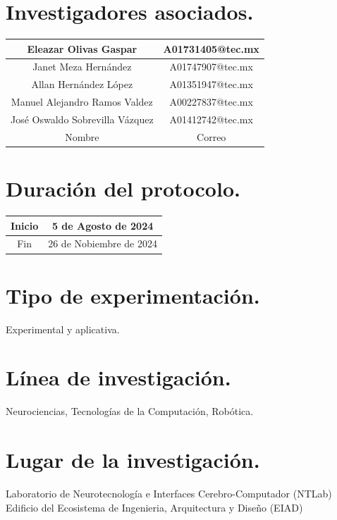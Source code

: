 \documentclass[12pt]{article}
\begin{document}
\section{Investigadores asociados.}

\begin{table}[h!]
    \centering
    \begin{tabular}{|c|c|} \hline
        Eleazar Olivas Gaspar & A01731405@tec.mx \\ \hline
        Janet Meza Hernández & A01747907@tec.mx \\ \hline
        Allan Hernández López & A01351947@tec.mx \\ \hline
        Manuel Alejandro Ramos Valdez & A00227837@tec.mx \\ \hline
        José Oswaldo Sobrevilla Vázquez & A01412742@tec.mx  \\ \hline
        Nombre & Correo \\ \hline
    \end{tabular}
\end{table}

\section{Duración del protocolo.}

\begin{table}[h!]
    \centering
    \begin{tabular}{|c|c|} \hline
        Inicio & 5 de Agosto de 2024 \\ \hline
        Fin & 26 de Nobiembre de 2024 \\ \hline
    \end{tabular}
\end{table}

\section{Tipo de experimentación.}
    Experimental y aplicativa.

\section{Línea de investigación.}
    Neurociencias, Tecnologías de la Computación, Robótica.

\section{Lugar de la investigación.}
    Laboratorio de Neurotecnología e Interfaces Cerebro-Computador (NTLab)
    Edificio del Ecosistema de Ingenieria, Arquitectura y Diseño (EIAD)
\end{document}
